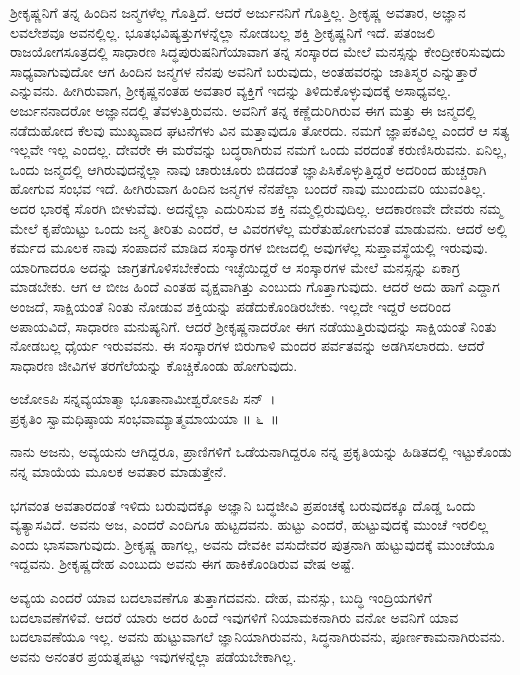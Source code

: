 ಶ‍್ರೀಕೃಷ್ಣನಿಗೆ ತನ್ನ ಹಿಂದಿನ ಜನ್ಮಗಳೆಲ್ಲ ಗೊತ್ತಿದೆ. ಆದರೆ ಅರ್ಜುನನಿಗೆ ಗೊತ್ತಿಲ್ಲ. ಶ‍್ರೀಕೃಷ್ಣ ಅವತಾರ, ಅಜ್ಞಾನ ಲವಲೇಶವೂ ಅವನಲ್ಲಿಲ್ಲ. ಭೂತಭವಿಷ್ಯತ್ತುಗಳನ್ನೆಲ್ಲಾ ನೋಡಬಲ್ಲ ಶಕ್ತಿ ಶ‍್ರೀಕೃಷ್ಣನಿಗೆ ಇದೆ. ಪತಂಜಲಿ ರಾಜಯೋಗಸೂತ್ರದಲ್ಲಿ ಸಾಧಾರಣ ಸಿದ್ಧಪುರುಷನಿಗೆ\break ಯಾವಾಗ ತನ್ನ ಸಂಸ್ಕಾರದ ಮೇಲೆ ಮನಸ್ಸನ್ನು ಕೇಂದ್ರೀಕರಿಸುವುದು ಸಾಧ್ಯವಾಗುವುದೋ ಆಗ ಹಿಂದಿನ ಜನ್ಮಗಳ ನೆನಪು ಅವನಿಗೆ ಬರುವುದು, ಅಂತಹವರನ್ನು ಜಾತಿಸ್ಮರ ಎನ್ನುತ್ತಾರೆ ಎನ್ನುವನು. ಹೀಗಿರುವಾಗ, ಶ‍್ರೀಕೃಷ್ಣನಂತಹ ಅವತಾರ ವ್ಯಕ್ತಿಗೆ ಇದನ್ನು ತಿಳಿದುಕೊಳ್ಳುವುದಕ್ಕೆ ಅಸಾಧ್ಯವಲ್ಲ. ಅರ್ಜುನನಾದರೋ ಅಜ್ಞಾನದಲ್ಲಿ ತೆವಳುತ್ತಿರುವನು. ಅವನಿಗೆ ತನ್ನ ಕಣ್ಣೆದುರಿಗಿರುವ ಈಗ ಮತ್ತು ಈ ಜನ್ಮದಲ್ಲಿ ನಡೆದುಹೋದ ಕೆಲವು ಮುಖ್ಯವಾದ ಘಟನೆಗಳು ವಿನ ಮತ್ತಾವುದೂ ತೋರದು. ನಮಗೆ ಜ್ಞಾಪಕವಿಲ್ಲ ಎಂದರೆ ಆ ಸತ್ಯ ಇಲ್ಲವೇ ಇಲ್ಲ ಎಂದಲ್ಲ. ದೇವರೇ ಈ ಮರೆವನ್ನು ಬದ್ಧರಾಗಿರುವ ನಮಗೆ ಒಂದು ವರದಂತೆ ಕರುಣಿಸಿರುವನು. ಏನಿಲ್ಲ, ಒಂದು ಜನ್ಮದಲ್ಲಿ ಆಗಿರುವುದನ್ನೆಲ್ಲಾ ನಾವು ಚಾರುಚೂರು ಬಿಡದಂತೆ ಜ್ಞಾಪಿಸಿಕೊಳ್ಳುತ್ತಿದ್ದರೆ ಅದರಿಂದ ಹುಚ್ಚರಾಗಿ ಹೋಗುವ ಸಂಭವ ಇದೆ. ಹೀಗಿರುವಾಗ ಹಿಂದಿನ ಜನ್ಮಗಳ ನೆನಪೆಲ್ಲಾ ಬಂದರೆ ನಾವು ಮುಂದುವರಿ ಯುವಂತಿಲ್ಲ. ಅದರ ಭಾರಕ್ಕೆ ಸೊರಗಿ ಬೀಳುವೆವು. ಅದನ್ನೆಲ್ಲಾ ಎದುರಿಸುವ ಶಕ್ತಿ ನಮ್ಮಲ್ಲಿರುವುದಿಲ್ಲ. ಆದಕಾರಣವೇ ದೇವರು ನಮ್ಮ ಮೇಲೆ ಕೃಪೆಯಿಟ್ಟು ಒಂದು ಜನ್ಮ ತೀರಿತು ಎಂದರೆ, ಆ ವಿವರಗಳೆಲ್ಲ ಮರೆತುಹೋಗುವಂತೆ ಮಾಡುವನು. ಆದರೆ ಅಲ್ಲಿ ಕರ್ಮದ ಮೂಲಕ ನಾವು ಸಂಪಾದನೆ ಮಾಡಿದ ಸಂಸ್ಕಾರಗಳ ಬೀಜದಲ್ಲಿ ಅವುಗಳೆಲ್ಲ ಸುಪ್ತಾವಸ್ಥೆಯಲ್ಲಿ ಇರುವುವು. ಯಾರಿಗಾದರೂ ಅದನ್ನು ಜಾಗ್ರತಗೊಳಿಸಬೇಕೆಂದು ಇಚ್ಛೆಯಿದ್ದರೆ ಆ ಸಂಸ್ಕಾರಗಳ ಮೇಲೆ ಮನಸ್ಸನ್ನು ಏಕಾಗ್ರ ಮಾಡಬೇಕು. ಆಗ ಆ ಬೀಜ ಹಿಂದೆ ಎಂತಹ ವೃಕ್ಷವಾಗಿತ್ತು ಎಂಬುದು ಗೊತ್ತಾಗುವುದು. ಆದರೆ ಅದು ಹಾಗೆ ಎದ್ದಾಗ ಅಂಜದೆ, ಸಾಕ್ಷಿಯಂತೆ ನಿಂತು ನೋಡುವ ಶಕ್ತಿಯನ್ನು ಪಡೆದುಕೊಂಡಿರಬೇಕು. ಇಲ್ಲದೇ ಇದ್ದರೆ ಅದರಿಂದ ಅಪಾಯವಿದೆ, ಸಾಧಾರಣ ಮನುಷ್ಯನಿಗೆ. ಆದರೆ ಶ‍್ರೀಕೃಷ್ಣನಾದರೋ ಈಗ ನಡೆಯುತ್ತಿರುವುದನ್ನು ಸಾಕ್ಷಿಯಂತೆ ನಿಂತು ನೋಡಬಲ್ಲ ಧೈರ್ಯ ಇರುವವನು. ಈ ಸಂಸ್ಕಾರಗಳ ಬಿರುಗಾಳಿ ಮಂದರ ಪರ್ವತವನ್ನು ಅಡಗಿಸಲಾರದು. ಆದರೆ ಸಾಧಾರಣ ಜೀವಿಗಳ ತರಗೆಲೆಯನ್ನು ಕೊಚ್ಚಿಕೊಂಡು ಹೋಗುವುದು.

\begin{shloka}
ಅಜೋಽಪಿ ಸನ್ನವ್ಯಯಾತ್ಮಾ ಭೂತಾನಾಮೀಶ್ವರೋಽಪಿ ಸನ್​~।\\ಪ್ರಕೃತಿಂ ಸ್ವಾಮಧಿಷ್ಠಾಯ ಸಂಭವಾಮ್ಯಾತ್ಮಮಾಯಯಾ \hfill॥ ೬~॥
\end{shloka}

\begin{artha}
ನಾನು ಅಜನು, ಅವ್ಯಯನು ಆಗಿದ್ದರೂ, ಪ್ರಾಣಿಗಳಿಗೆ ಒಡೆಯನಾಗಿದ್ದರೂ ನನ್ನ ಪ್ರಕೃತಿಯನ್ನು ಹಿಡಿತದಲ್ಲಿ ಇಟ್ಟುಕೊಂಡು ನನ್ನ ಮಾಯೆಯ ಮೂಲಕ ಅವತಾರ ಮಾಡುತ್ತೇನೆ.
\end{artha}

ಭಗವಂತ ಅವತಾರದಂತೆ ಇಳಿದು ಬರುವುದಕ್ಕೂ ಅಜ್ಞಾನಿ ಬದ್ಧಜೀವಿ ಪ್ರಪಂಚಕ್ಕೆ ಬರುವು\-ದಕ್ಕೂ ದೊಡ್ಡ ಒಂದು ವ್ಯತ್ಯಾಸವಿದೆ. ಅವನು ಅಜ, ಎಂದರೆ ಎಂದಿಗೂ ಹುಟ್ಟದವನು. ಹುಟ್ಟು ಎಂದರೆ, ಹುಟ್ಟುವುದಕ್ಕೆ ಮುಂಚೆ ಇರಲಿಲ್ಲ ಎಂದು ಭಾಸವಾಗುವುದು. ಶ‍್ರೀಕೃಷ್ಣ ಹಾಗಲ್ಲ, ಅವನು ದೇವಕೀ ವಸುದೇವರ ಪುತ್ರನಾಗಿ ಹುಟ್ಟುವುದಕ್ಕೆ ಮುಂಚೆಯೂ ಇದ್ದವನು. ಶ‍್ರೀಕೃಷ್ಣದೇಹ ಎಂಬುದು ಅವನು ಈಗ ಹಾಕಿಕೊಂಡಿರುವ ವೇಷ ಅಷ್ಟೆ.

ಅವ್ಯಯ ಎಂದರೆ ಯಾವ ಬದಲಾವಣೆಗೂ ತುತ್ತಾಗದವನು. ದೇಹ, ಮನಸ್ಸು, ಬುದ್ಧಿ ಇಂದ್ರಿಯಗಳಿಗೆ ಬದಲಾವಣೆಗಳಿವೆ. ಆದರೆ ಯಾರು ಅದರ ಹಿಂದೆ ಇವುಗಳಿಗೆ ನಿಯಾಮಕನಾಗಿರು ವನೋ ಅವನಿಗೆ ಯಾವ ಬದಲಾವಣೆಯೂ ಇಲ್ಲ. ಅವನು ಹುಟ್ಟುವಾಗಲೆ ಜ್ಞಾನಿಯಾಗಿರುವನು, ಸಿದ್ಧನಾಗಿರುವನು, ಪೂರ್ಣಕಾಮನಾಗಿರುವನು. ಅವನು ಅನಂತರ ಪ್ರಯತ್ನಪಟ್ಟು ಇವುಗಳನ್ನೆಲ್ಲಾ ಪಡೆಯಬೇಕಾಗಿಲ್ಲ.

